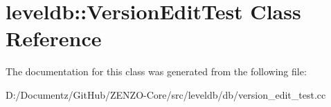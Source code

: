 \hypertarget{classleveldb_1_1_version_edit_test}{}\section{leveldb\+::Version\+Edit\+Test Class Reference}
\label{classleveldb_1_1_version_edit_test}


The documentation for this class was generated from the following file\+:\begin{DoxyCompactItemize}
\item 
D\+:/\+Documentz/\+Git\+Hub/\+Z\+E\+N\+Z\+O-\/\+Core/src/leveldb/db/version\+\_\+edit\+\_\+test.\+cc\end{DoxyCompactItemize}

